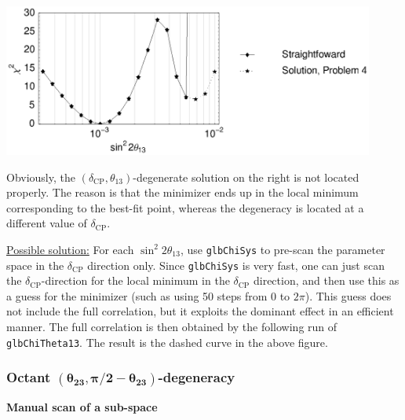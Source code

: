 \documentclass[12pt,a4paper]{article}
\newcommand{\aufg}[1]{\vspace{4mm}{\bf\underline{Problem #1:}}\vspace{3mm}}
\begin{document}
\begin{center}
\includegraphics[height=5cm]{problem4}
\end{center}

Obviously, the $(\delta_\mathrm{CP},\theta_{13})$-degenerate solution on the right is not located properly. The reason is that the minimizer ends up in the local minimum corresponding to the best-fit point, whereas the degeneracy is located at a different value of $\delta_\mathrm{CP}$.

\vspace*{3mm}

\underline{Possible solution:}
For each $\sin^2 2 \theta_{13}$, use {\tt glbChiSys} to pre-scan the parameter space in the $\delta_{\mathrm{CP}}$ direction only. Since {\tt glbChiSys} is very fast, one can just scan the $\delta_{\mathrm{CP}}$-direction for the local minimum in the $\delta_{\mathrm{CP}}$ direction, and then use this
as a guess for the minimizer (such as using 50 steps from $0$ to $2 \pi$). This guess does not include the full correlation, but it exploits the dominant effect in an efficient manner. The full correlation is then obtained by the following run of {\tt glbChiTheta13}. The result is the dashed curve in the above figure.

\subsubsection*{Octant $\boldsymbol{(\theta_{23},\pi/2-\theta_{23})}$-degeneracy } 

\aufg{5} {\bf Manual scan of a sub-space}
\end{document}
